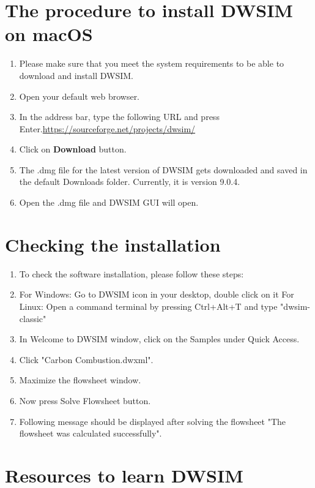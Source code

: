 \documentclass[a4paper,12pt]{article}
\begin{document}
\section{The procedure to install DWSIM on macOS}

\begin{enumerate}
	\item Please make sure that you meet the system requirements to be able to download and install DWSIM.
	\item Open your default web browser.
	\item In the address bar, type the following URL and press Enter.\newline \url{https://sourceforge.net/projects/dwsim/}
	\item Click on \textbf{Download} button.
	\item The .dmg file for the latest version of DWSIM gets downloaded and saved in the default Downloads folder. Currently, it is version 9.0.4.
	\item Open the .dmg file and DWSIM GUI will open.
\end{enumerate}


\section{Checking the installation}

\begin{enumerate}

\item To check the software installation, please follow these steps:
\item For Windows: Go to DWSIM icon in your desktop, double click on it
\newline For Linux: Open a command terminal by pressing Ctrl+Alt+T and type "dwsim-classic"
\item In Welcome to DWSIM window, click on the Samples under Quick Access.
\item Click "Carbon Combustion.dwxml".
\item Maximize the flowsheet window.
\item Now press Solve Flowsheet button.
\item Following message should be displayed after solving the flowsheet "The flowsheet was calculated successfully".

\end{enumerate}
\section{Resources to learn DWSIM}
\end{document}
